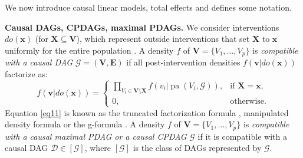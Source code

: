 \documentclass[11pt,a4paper]{article}
\theoremstyle{definition}
\theoremstyle{remark}
\DeclareMathOperator{\pa}{pa}
\DeclareMathOperator{\possde}{possde}
\newcommand{\mpdag}{maximal PDAG}
\newcommand{\g}[1][G]{\mathcal{#1}}
\newcommand{\vsp}{\vspace{.2cm}}
\begin{document}
We now introduce causal linear models, total effects and defines some notation.

\vsp\noindent\textbf{Causal DAGs, CPDAGs, \mpdag{}s.} 
We consider interventions $do(\mathbf{x})$ (for $\mathbf{X}\subseteq \mathbf{V}$), which represent outside interventions that set $\mathbf{X}$ to $\mathbf{x}$ uniformly for the entire population \citep{pearl1995causal}.
A density $f$  of $\mathbf{V} = \{V_1,\dots,V_p\}$ is \textit{compatible with a causal DAG} $\g =(\mathbf{V},\mathbf{E})$ if all post-intervention densities $f(\mathbf{v}|do(\mathbf{x}))$ factorize as:
\begin{equation}
f(\mathbf{v}|do(\mathbf{x}))=
\begin{cases}
\prod_{V_{i} \in \mathbf{V} \setminus \mathbf{X}}f(v_{i}|\pa(V_{i},\g)), &  \text{if }\mathbf{X} =\mathbf{x}, \\
0, & \text{otherwise.}
\end{cases}
\label{eq11}
\end{equation}
Equation \eqref{eq11} is known as the truncated factorization formula \citep{pearl2009causality}, manipulated density formula \citep{spirtes2000causation} or the g-formula \citep{robins1986new}. 
A density $f$  of $\mathbf{V} = \{V_1,\dots,V_p\}$ is \textit{compatible with a causal \mpdag{} or a causal CPDAG} $\g$ if it is compatible with a causal DAG $\g[D] \in [\g]$, where $[\g]$ is the class of DAGs represented by $\g$.




%
\end{document}
